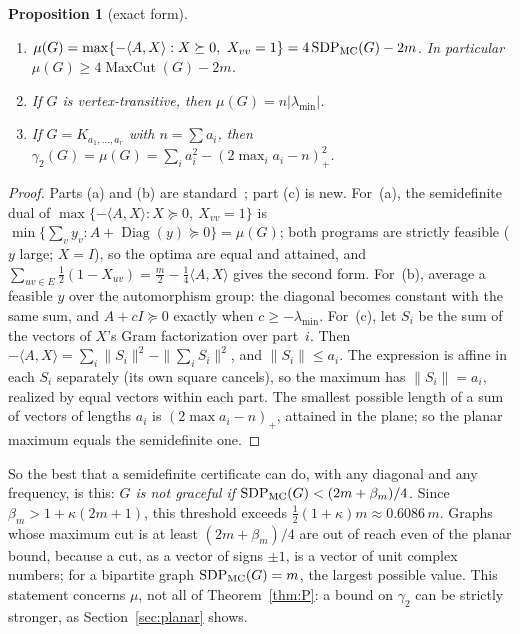 \documentclass[11pt]{amsart}
\newcommand{\thmmarker}{}
\newcommand{\mgpt}{\gdef\thmmarker{\textsuperscript{$\dagger$}}}
\theoremstyle{tplain}
\newtheorem{proposition}[theorem]{Proposition}
\theoremstyle{tdefinition}
\theoremstyle{tremark}
\newcommand{\lmin}{\lambda_{\min}}
\newcommand{\Diag}{\operatorname{Diag}}
\newcommand{\SDP}{\operatorname{SDP}}
\begin{document}
\mgpt\begin{proposition}[exact form]\label{prop:maxcut}
\leavevmode
\begin{enumerate}[label=(\alph*)]
\item $\mu(G)=\max\{-\langle A,X\rangle:X\succeq0,\ X_{vv}=1\}
  =4\SDP_{\rm MC}(G)-2m$. In particular $\mu(G)\ge4\operatorname{MaxCut}(G)-2m$.
\item If $G$ is vertex-transitive, then $\mu(G)=n|\lmin|$.
\item If $G=K_{a_1,\dots,a_r}$ with $n=\sum a_i$, then
  $\gamma_2(G)=\mu(G)=\sum_ia_i^2-(2\max_ia_i-n)_+^2$.
\end{enumerate}
\end{proposition}

\begin{proof}
Parts (a) and (b) are standard~\cite{dp,mp}; part (c) is new. For~(a), the semidefinite dual of
$\max\{-\langle A,X\rangle:X\succeq0,\ X_{vv}=1\}$ is
$\min\{\sum_vy_v:A+\Diag(y)\succeq0\}=\mu(G)$; both programs are strictly
feasible ($y$ large; $X=I$), so the optima are equal and attained, and
$\sum_{uv\in E}\frac12(1-X_{uv})=\frac m2-\frac14\langle A,X\rangle$ gives the
second form. For~(b), average a feasible $y$ over the automorphism group: the diagonal
becomes constant with the same sum, and $A+cI\succeq0$ exactly when
$c\ge-\lmin$. For~(c), let $S_i$ be the sum of the vectors of $X$'s Gram
factorization over part~$i$. Then $-\langle A,X\rangle=\sum_i\|S_i\|^2-\|\sum_iS_i\|^2$,
and $\|S_i\|\le a_i$. The expression is affine in each $S_i$ separately (its
own square cancels), so the maximum has $\|S_i\|=a_i$, realized by equal
vectors within each part. The smallest possible length of a sum of vectors of
lengths $a_i$ is $(2\max a_i-n)_+$, attained in the plane; so the planar
maximum equals the semidefinite one.
\end{proof}

So the best that a semidefinite certificate can do, with any diagonal and
any frequency, is this: \emph{$G$ is not graceful if
$\SDP_{\rm MC}(G)<(2m+\beta_m)/4$.} Since $\beta_m>1+\kappa(2m+1)$, this
threshold exceeds $\frac12(1+\kappa)m\approx0.6086\,m$. Graphs whose maximum
cut is at least $(2m+\beta_m)/4$ are out of reach even of the planar bound,
because a cut, as a vector of signs $\pm1$, is a vector of unit complex
numbers; for a bipartite graph
$\SDP_{\rm MC}(G)=m$, the largest possible value. This statement concerns
$\mu$, not all of Theorem~\ref{thm:P}: a bound on $\gamma_2$ can be strictly
stronger, as Section~\ref{sec:planar} shows.
\end{document}
